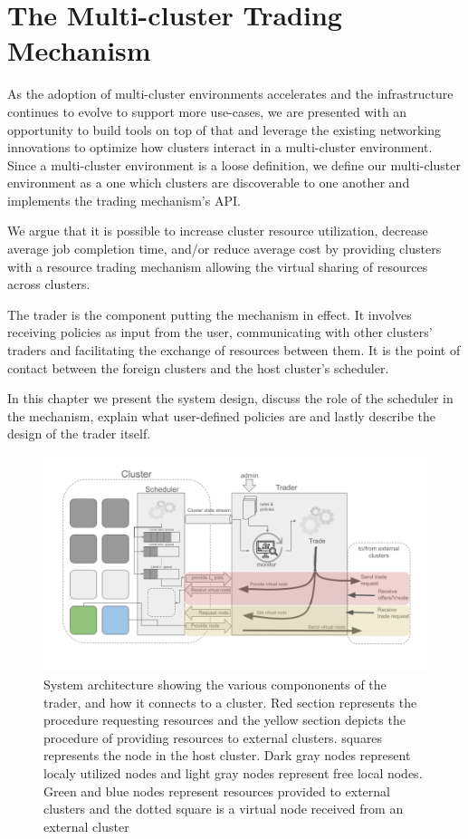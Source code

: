 
\chapter{The Multi-cluster Trading Mechanism}

As the adoption of multi-cluster environments accelerates and the
infrastructure continues to evolve to support more use-cases, we are presented
with an opportunity to build tools on top of that and leverage the existing
networking innovations to optimize how clusters interact in a multi-cluster
environment. Since a multi-cluster environment is a loose definition, we define
our multi-cluster environment as a one which clusters are discoverable to one
another and implements the trading mechanism's API.

We argue that it is possible to increase cluster resource utilization,
decrease average job completion time, and/or reduce average cost by providing
clusters with a resource trading mechanism allowing the virtual sharing of
resources across clusters. 

The trader is the component putting the mechanism in effect. It involves
receiving policies as input from the user, communicating with other clusters'
traders and facilitating the exchange of resources between them. It is the
point of contact between the foreign clusters and the host cluster's scheduler.

In this chapter we present the system design, discuss the role of the scheduler
in the mechanism, explain what user-defined policies are and lastly describe
the design of the trader itself. 

\begin{figure}[H]
  \centerline{\includegraphics[scale=0.45]{figures/system-diagram}}
  \caption{System architecture showing the various compononents of the trader,
    and how it connects to a cluster. Red section represents the procedure
    requesting resources and the yellow section depicts the procedure of
    providing resources to external clusters. squares represents the node in
    the host cluster. Dark gray nodes represent localy utilized nodes and light
    gray nodes represent free local nodes. Green and blue nodes represent
    resources    provided to external clusters and the dotted square is a
    virtual node received from an external cluster} 
\end{figure}

